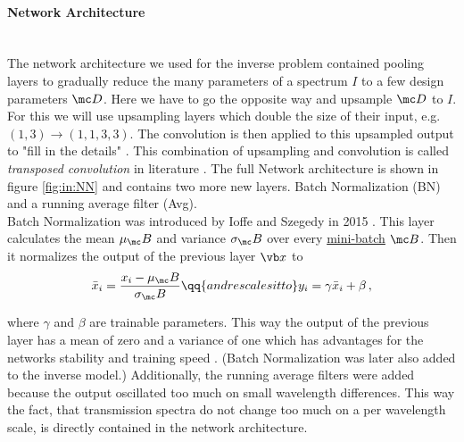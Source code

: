 \paragraph{Network Architecture}~\\
The network architecture we used for the inverse problem contained pooling layers to gradually reduce the many parameters of a spectrum $I$ to a few design parameters $\mc D$. Here we have to go the opposite way and upsample $\mc D$ to $I$. For this we will use upsampling layers which double the size of their input, e.g. $(1,3) \rightarrow (1,1,3,3)$. The convolution is then applied to this upsampled output to "fill in the details" \cite{fill_in_details}. This combination of upsampling and convolution is called \textit{transposed convolution} in literature \cite{TransposedConv}. The full Network architecture is shown in figure \ref{fig:in:NN} and contains two more new layers. Batch Normalization (BN) and a running average filter (Avg).
\\

\indent
Batch Normalization was introduced by Ioffe and Szegedy in 2015 \cite{Ioffe2015}. This layer calculates the mean $\mu_\mc B$ and variance $\sigma_\mc B$ over every \hyperref[hyp:minibatch]{mini-batch} $\mc B$. Then it normalizes the output of the previous layer $\vb x$ to 
\begin{equation}
    \bar x_i = \frac{x_i - \mu_\mc B}{\sigma_\mc B}
    \qq{and rescales it to}
    y_i = \gamma \bar x_i + \beta \,,
\end{equation}

where $\gamma$ and $\beta$ are trainable parameters. This way the output of the previous layer has a mean of zero and a variance of one which has advantages for the networks stability and training speed \cite{Ioffe2015}.
(Batch Normalization was later also added to the inverse model.)
Additionally, the running average filters were added because the output oscillated too much on small wavelength differences.
This way the fact, that transmission spectra do not change too much on a per wavelength scale, is directly contained in the network architecture. 
\\

